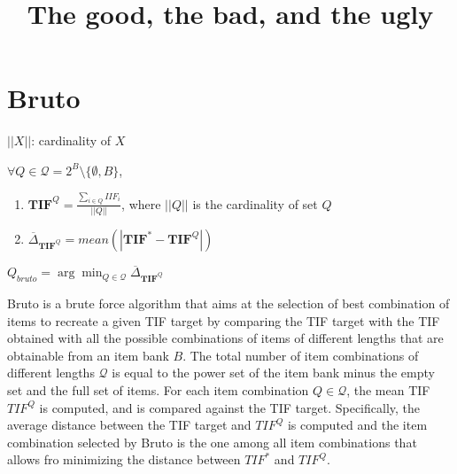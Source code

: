 \documentclass[12pt, a4paper, titilepage]{article}
\title{The good, the bad, and the ugly}
\author{}
\begin{document}
\maketitle

\begin{abstract}

\end{abstract}

\newpage

\doublespacing


\section{Bruto}




$||X||$: cardinality of $X$



$\forall Q \in\mathcal{Q} = 2^B \setminus \{\emptyset, B\}$, 

\begin{enumerate}
	\item $\mathbf{TIF}^{Q} =  \frac{\sum_{i \in Q} IIF_i}{||Q||}$, where $||Q||$ is the cardinality of set $Q$
	\item $\overline{\Delta}_{\mathbf{TIF}^{Q}} =  \mathit{mean}(|\mathbf{TIF}^* - \mathbf{TIF}^{Q}|)$ %
	
\end{enumerate}


$Q_{bruto} = \arg \min_{Q \in \mathcal{Q}} \overline{\Delta}_{\mathbf{TIF}^{Q}}$


Bruto is a brute force algorithm that aims at the selection of best combination of items to recreate a given TIF target by comparing the TIF target with the TIF obtained with all the possible combinations of items of different lengths that are obtainable from an item bank $B$. The total number of item combinations of different lengths $\mathcal{Q}$ is equal to the power set of the item bank minus the empty set and the full set of items. For each item combination $Q \in \mathcal{Q}$, the mean TIF $TIF^Q$ is computed, and is compared against the TIF target. Specifically, the average distance between the TIF target and $TIF^Q$ is computed and the item combination selected by Bruto is the one among all item combinations that allows fro minimizing the distance between $TIF^*$ and $TIF^Q$.
\end{document}
